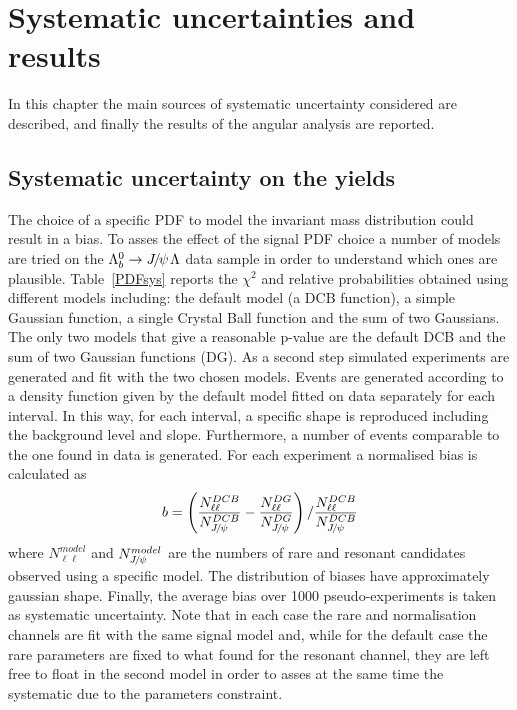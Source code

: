 \chapter{Systematic uncertainties and results}
\label{sec:Lb_sys}

In this chapter the main sources of systematic uncertainty considered are described,
and finally the results of the angular analysis are reported.

\section{Systematic uncertainty on the yields}
\label{sec:Lb_yield_sys}

The choice of a specific PDF to model the invariant mass distribution could result
in a bias. To asses the effect of the signal PDF choice a number of models
are tried on the $\Lb\to\jpsi\Lz$ data sample in order to understand which ones are plausible.
Table~\ref{PDFsys} reports the $\chi^2$ and relative probabilities obtained using different
models including: the default model (a DCB function), a simple Gaussian function,
a single Crystal Ball function and the sum of two Gaussians. The only two models that
give a reasonable p-value are the default DCB and the sum of two Gaussian functions (DG).
As a second step simulated experiments are generated and fit with the two chosen models.
Events are generated according to a density function given by the default model fitted
on data separately for each \qsq interval. In this way, for each \qsq interval, a specific
shape is reproduced including the background level and slope. Furthermore, a number 
of events comparable to the one found in data is generated. For each experiment a normalised
bias is calculated as
%
\begin{equation}
b = \left(\frac{N^{DCB}_{\ell\ell}}{N^{DCB}_{\jpsi}} - \frac{N^{DG}_{\ell\ell}}{N^{DG}_{\jpsi}}\right) / \frac{N^{DCB}_{\ell\ell}}{N^{DCB}_{\jpsi}}
\end{equation}
%
where $N^{model}_{\ell\ell}$ and $N^{model}_{\jpsi}$ are the numbers of rare and resonant candidates
observed using a specific model. The distribution of biases have approximately gaussian shape.
Finally, the average bias over 1000 pseudo-experiments is taken
as systematic uncertainty. Note that in each case the rare and normalisation channels are fit
with the same signal model and, while for the default case the rare parameters are fixed to what found
for the resonant channel, they are left free to float in the second model in order to asses
at the same time the systematic due to the parameters constraint.

